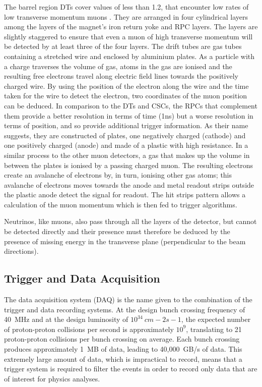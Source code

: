 The barrel region DTs cover \abseta values of less than 1.2, that encounter low rates of low transverse
momentum muons \cite{CMS_TDR1}. They are arranged in four cylindrical layers among the layers of the magnet's
iron return yoke and RPC layers. The layers are slightly staggered to ensure that even a muon of high
transverse momentum will be detected by at least three of the four layers. The drift tubes are gas tubes
containing a stretched wire and enclosed by aluminium plates. As a particle with a charge traverses the volume
of gas, atoms in the gas are ionised and the resulting free electrons travel along electric field lines
towards the positively charged wire. By using the position of the electron along the wire and the time taken
for the wire to detect the electron, two coordinates of the muon position can be deduced.
In comparison to the DTs and CSCs, the RPCs that complement them provide a better resolution in terms of time
(1ns) but a worse resolution in terms of position, and so provide additional trigger information. As their
name suggests, they are constructed of plates, one negatively charged (cathode) and one positively charged
(anode) and made of a plastic with high resistance. In a similar process to the other muon detectors, a gas
that makes up the volume in between the plates is ionised by a passing charged muon. The resulting electrons
create an avalanche of electrons by, in turn, ionising other gas atoms; this avalanche of electrons moves
towards the anode and metal readout strips outside the plastic anode detect the signal for readout. The hit
strips pattern allows a calculation of the muon momentum which is then fed to trigger algorithms.

Neutrinos, like muons, also pass through all the layers of the detector, but cannot be detected directly and
their presence must therefore be deduced by the presence of missing energy in the transverse plane
(perpendicular to the beam directions).

\subsection{Trigger and Data Acquisition}
\label{ss:Trigger}
The data acquisition system (DAQ) is the name given to the combination of the trigger and data recording
systems. At the design bunch crossing frequency of 40~MHz and at the design luminosity of $10^{34}~cm-2s-1$,
the expected number of proton-proton collisions per second is approximately $10^{9}$, translating to 21
proton-proton collisions per bunch crossing on average. Each bunch crossing produces approximately 1~MB of
data, leading to 40,000~GB/s of data. This extremely large amount of data, which is impractical to
record, means that a trigger system is required to filter the events in order to record only data that are of
interest for physics analyses.

